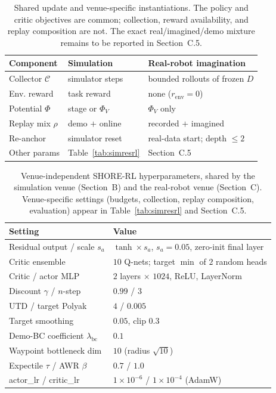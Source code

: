 \documentclass[letterpaper]{article} %
\begin{document}
\begin{table}[t]
\centering\small\setlength{\tabcolsep}{3pt}
\begin{tabular}{@{}p{}p{}p{}@{}}
\toprule
Component & Simulation & Real-robot imagination \\
\midrule
Collector $\mathcal C$ & simulator steps & bounded rollouts of frozen $D$ \\
Env. reward & task reward & none ($r_{\mathrm{env}}=0$) \\
Potential $\Phi$ & stage or $\Phi_V$ & $\Phi_V$ only \\
Replay mix $\rho$ & demo $+$ online & recorded $+$ imagined \\
Re-anchor & simulator reset & real-data start; depth $\leq2$ \\
Other params & Table~\ref{tab:simresrl} & Section~C.5 \\
\bottomrule
\end{tabular}
\caption{Shared update and venue-specific instantiations. The policy and critic objectives
are common; collection, reward availability, and replay composition are not. The exact
real/imagined/demo mixture remains to be reported in Section~C.5.}
\label{tab:venueinst}
\end{table}

\begin{table}[t]
\centering\small\setlength{\tabcolsep}{4pt}
\begin{tabular}{@{}ll@{}}
\toprule
Setting & Value \\
\midrule
Residual output / scale $s_a$   & $\tanh\times s_a$, $s_a=0.05$, zero-init final layer \\
Critic ensemble                 & $10$ Q-nets; target $\min$ of $2$ random heads \\
Critic / actor MLP              & $2$ layers $\times$ $1024$, ReLU, LayerNorm \\
Discount $\gamma$ / $n$-step    & $0.99$ / $3$ \\
UTD / target Polyak             & $4$ / $0.005$ \\
Target smoothing                & $0.05$, clip $0.3$ \\
Demo-BC coefficient $\lambda_{\mathrm{bc}}$ & $0.1$ \\
Waypoint bottleneck dim         & $10$ (radius $\sqrt{10}$) \\
Expectile $\tau$ / AWR $\beta$  & $0.7$ / $1.0$ \\
actor\_lr / critic\_lr          & $1{\times}10^{-6}$ / $1{\times}10^{-4}$ (AdamW) \\
\bottomrule
\end{tabular}
\caption{Venue-independent SHORE-RL hyperparameters, shared by the simulation venue
(Section~B) and the real-robot venue (Section~C). Venue-specific settings (budgets,
collection, replay composition, evaluation) appear in Table~\ref{tab:simresrl} and
Section~C.5.}
\label{tab:sharedhp}
\end{table}
\end{document}
